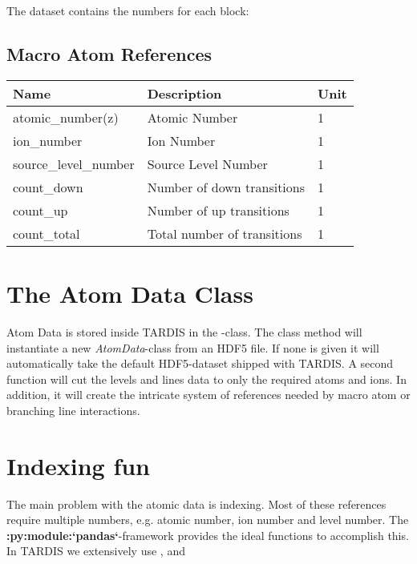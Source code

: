 \documentclass[letterpaper,10pt,english]{sphinxmanual}
\begin{document}
The  dataset contains the numbers for each block:


\subsection{Macro Atom References}
\label{atomic:macro-atom-references}
\begin{tabulary}{\linewidth}{|L|L|L|}
\hline
\textbf{
Name
} & \textbf{
Description
} & \textbf{
Unit
}\\\hline

atomic\_number(z)
 & 
Atomic Number
 & 
1
\\\hline

ion\_number
 & 
Ion Number
 & 
1
\\\hline

source\_level\_number
 & 
Source Level Number
 & 
1
\\\hline

count\_down
 & 
Number of down transitions
 & 
1
\\\hline

count\_up
 & 
Number of up transitions
 & 
1
\\\hline

count\_total
 & 
Total number of transitions
 & 
1
\\\hline
\end{tabulary}



\section{The Atom Data Class}
\label{atomic:the-atom-data-class}
Atom Data is stored inside TARDIS in the -class. The class method  will
instantiate a new \emph{AtomData}-class from an HDF5 file. If none is given it will automatically
take the default HDF5-dataset shipped with TARDIS. A second function 
will cut the levels and lines data to only the required atoms and ions. In addition, it will create the intricate system
of references needed by macro atom or branching line interactions.


\section{Indexing fun}
\label{atomic:indexing-fun}
The main problem with the atomic data is indexing. Most of these references require multiple numbers, e.g. atomic number,
ion number and level number. The {\color{red}\bfseries{}:py:module:{}`pandas{}`}-framework provides the ideal functions to accomplish this. In TARDIS we extensively
use ,  and 
\end{document}
